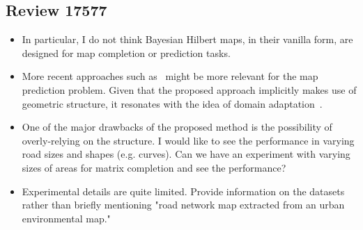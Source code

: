 \documentclass{article}
\newcommand{\response}[1]{{\color{black}\smallskip\\ #1 }}
\begin{document}
\subsection*{Review 17577}
{\color{blue}
    \begin{itemize}
        \item
        In particular, I do not think Bayesian
        Hilbert maps, in their vanilla form, are designed for map
        completion or prediction tasks.
        \response{}
        
        \item
        More recent approaches such
        as~\cite{toyungyernsub2020double, tompkins2020online}  might be more relevant for the map prediction
        problem.  Given that the proposed approach implicitly makes
        use of geometric structure, it resonates with the idea of
        domain adaptation~\cite{tompkins2020online, li2019heterogeneous}.
        \response{}
        
        \item
        One of the major drawbacks of the proposed method is the
        possibility of overly-relying on the structure. I would
        like to see the performance in varying road sizes and
        shapes (e.g. curves). Can we have an experiment with
        varying sizes of areas for matrix completion and see the
        performance?
        \response{}
        
        \item
        Experimental details are quite limited. Provide information
        on the datasets rather than briefly mentioning "road
        network map extracted from an urban environmental map." 
        \response{}
\end{itemize}
}

{


}
\end{document}
